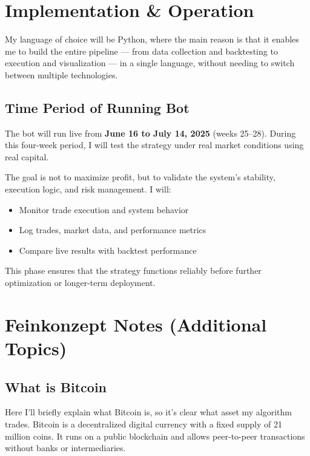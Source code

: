 \documentclass[9pt,a4paper,twocolumn,twoside]{tau-class/tau}
\begin{document}
\section{Implementation \& Operation}

My language of choice will be Python, where the main reason is that it enables me to build the entire pipeline — from data collection and backtesting to execution and visualization — in a single language, without needing to switch between multiple technologies.
\subsection{Time Period of Running Bot}

The bot will run live from \textbf{June 16 to July 14, 2025} (weeks 25–28). During this four-week period, I will test the strategy under real market conditions using real capital.

The goal is not to maximize profit, but to validate the system’s stability, execution logic, and risk management. I will:
\begin{itemize}
  \item Monitor trade execution and system behavior
  \item Log trades, market data, and performance metrics
  \item Compare live results with backtest performance
\end{itemize}

This phase ensures that the strategy functions reliably before further optimization or longer-term deployment.


\section{Feinkonzept Notes (Additional Topics)}




\subsection{What is Bitcoin}

Here I’ll briefly explain what Bitcoin is, so it’s clear what asset my algorithm trades. Bitcoin is a decentralized digital currency with a fixed supply of 21 million coins. It runs on a public blockchain and allows peer-to-peer transactions without banks or intermediaries.
\end{document}
